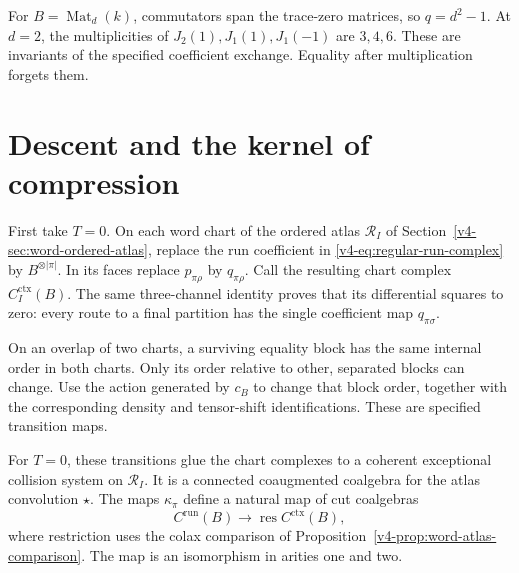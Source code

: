 For \(B=\operatorname{Mat}_d(k)\), commutators span
the trace-zero matrices, so \(q=d^2-1\).
At \(d=2\), the multiplicities of
\(J_2(1),J_1(1),J_1(-1)\) are \(3,4,6\).
These are invariants of the specified coefficient
exchange. Equality after multiplication forgets them.

\section{Descent and the kernel of compression}
\label{v4-sec:regular-descent}

First take \(T=0\). On each word chart of the ordered
atlas \(\mathscr R_I\) of
Section~\ref{v4-sec:word-ordered-atlas}, replace the
run coefficient in \eqref{v4-eq:regular-run-complex}
by \(B^{\otimes|\pi|}\). In its faces replace
\(p_{\pi\rho}\) by \(q_{\pi\rho}\).
Call the resulting chart complex \(C_I^{\mathrm{ctx}}(B)\).
The same three-channel identity proves that its
differential squares to zero: every route to a final
partition has the single coefficient map \(q_{\pi\sigma}\).

On an overlap of two charts, a surviving equality
block has the same internal order in both charts.
Only its order relative to other, separated blocks
can change. Use the action generated by \(c_B\)
to change that block order, together with the
corresponding density and tensor-shift identifications.
These are specified transition maps.

\begin{theorem}\label{v4-thm:regular-contextual-descent}
For \(T=0\), these transitions glue the chart complexes
to a coherent exceptional collision system on
\(\mathscr R_I\). It is a connected coaugmented
coalgebra for the atlas convolution \(\star\).
The maps \(\kappa_\pi\) define a natural map of
cut coalgebras
\begin{equation}\label{v4-eq:regular-compression}
 C^{\mathrm{run}}(B)
       \longrightarrow\operatorname{res}
                              C^{\mathrm{ctx}}(B),
\end{equation}
where restriction uses the colax comparison of
Proposition~\ref{v4-prop:word-atlas-comparison}.
The map is an isomorphism in arities one and two.
\end{theorem}

